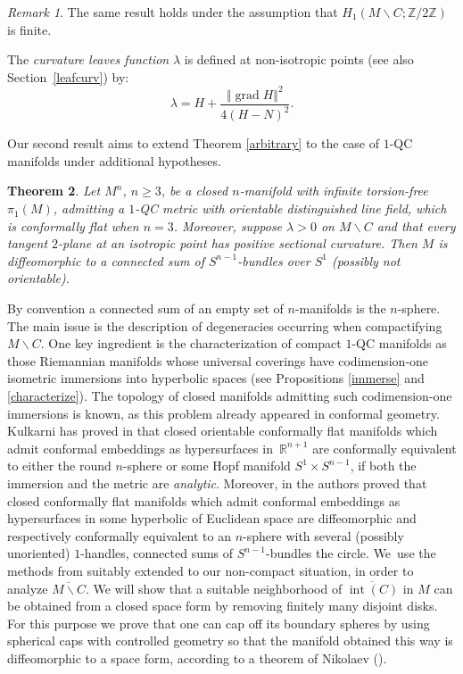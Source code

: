 \documentclass[JEP,XML,SOM,Unicode]{cedram}
\let\moins\smallsetminus
\DeclareMathOperator{\grad}{grad}
\DeclareMathOperator{\inte}{int}
\let\parallel\Vert
\newtheorem{theorem}{Theorem}[section]
\theoremstyle{definition}
\theoremstyle{remark}
\newtheorem{remark}[theorem]{Remark}
\numberwithin{equation}{section}
\newcommand{\ZZ}{\mathbb Z}
\begin{document}
\begin{remark}
The same result holds under the assumption that $H_1(M\moins C;\ZZ/2\ZZ)$ is finite.
\end{remark}

The \emph{curvature leaves function} $\lambda$ is defined at non-isotropic points
(see also Section~\ref{leafcurv}) by:
\[
\lambda=H + \frac{\parallel \grad H\parallel^2}{4(H-N)^2}.
\]

Our second result aims to extend Theorem \ref{arbitrary} to the case of $1$-QC manifolds under additional hypotheses.

\begin{theorem}\label{lambdapositive}
Let $M^n$, $n\geq3$, be a closed $n$-manifold with infinite torsion-free
$\pi_1(M)$, admitting a $1$-QC metric with orientable distinguished line field, which is conformally flat when $n=3$.
Moreover, suppose $\lambda >0$ on $M\moins C$ and that every tangent $2$-plane at an isotropic point has
positive sectional curvature.
Then $M$ is diffeomorphic to a connected sum of $S^{n-1}$-bundles over $S^1$ (possibly not orientable).
\end{theorem}

By convention a connected sum of an empty set of $n$-manifolds is the $n$-sphere. The main issue is the description of degeneracies occurring when compactifying $M\moins C$. One key ingredient is the characterization of compact $1$-QC manifolds as those Riemannian manifolds whose universal coverings have codimension-one isometric immersions into hyperbolic spaces (see
Propositions \ref{immerse} and \ref{characterize}). The topology of closed manifolds admitting such
codimension-one immersions is known, as this problem already appeared in conformal geometry. Kulkarni has proved in \cite{Kul} that closed orientable
conformally flat manifolds which admit conformal embeddings as hypersurfaces in~$\mathbb R^{n+1}$ are conformally equivalent to either the round $n$-sphere or
some Hopf manifold $S^1\times S^{n-1}$, if both
the immersion and the metric are \emph{analytic}. Moreover, in \cite{DDM,Pi} the authors proved that closed conformally flat manifolds which admit conformal embeddings as hypersurfaces in some
hyperbolic of Euclidean space are diffeomorphic and respectively
conformally equivalent to an $n$-sphere with several (possibly unoriented)
$1$-handles, \ie connected sums of $S^{n-1}$-bundles the circle. We~use the methods from \cite{DDM,Pi} suitably extended
to our non-compact situation, in order to analyze $\overline{M\moins C}$. We will show that a suitable neighborhood
of $\overline{\inte (C)}$ in $M$ can be obtained from a closed space form by removing finitely many
disjoint disks. For this purpose we prove that one can cap off its boundary spheres by using spherical caps with controlled geometry so that the manifold obtained this way is diffeomorphic to a space form, according to a theorem of Nikolaev (\cite{Nik}).
\end{document}
